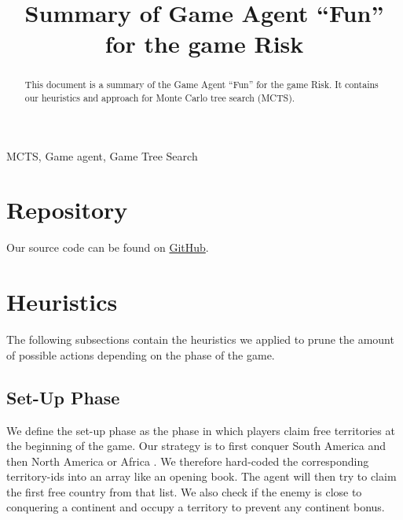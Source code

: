 \documentclass[conference]{IEEEtran}
\begin{document}
\title{Summary of Game Agent ``Fun'' for the game Risk}

\author{
    \and
}

\maketitle

\begin{abstract}
This document is a summary of the Game Agent ``Fun'' for the game Risk.
It contains our heuristics and approach for Monte Carlo tree search (MCTS).
\end{abstract}

\begin{IEEEkeywords}
MCTS, Game agent,  Game Tree Search
\end{IEEEkeywords}

\section*{Repository}

Our source code can be found on \href{https://github.com/mah-luke/PvSS}{GitHub}.

\section{Heuristics}

The following subsections contain the heuristics we applied to prune the amount of possible actions
depending on the phase of the game.

\subsection{Set-Up Phase}
\label{subsec:set-up-phase}

We define the set-up phase as the phase in which players claim free territories at the beginning of the game.
Our strategy is to first conquer South America and then North America or Africa \cite{web:south-america}.
We therefore hard-coded the corresponding territory-ids into an array like an opening book.
The agent will then try to claim the first free country from that list.
We also check if the enemy is close to conquering a continent and occupy a territory to prevent any continent bonus.
\end{document}
